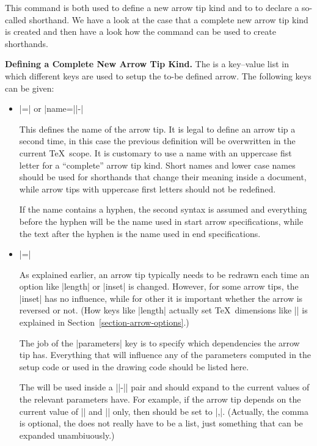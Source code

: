 \begin{command}{\pgfdeclarearrow{}}
  This command is both used to define a new arrow tip kind and to to
  declare a so-called shorthand. We have a look at the case that a
  complete new arrow tip kind is created and then have a look how the
  command can be used to create shorthands.
  
  \medskip
  \noindent\textbf{Defining a Complete New Arrow Tip Kind.}  
  The  is a key--value list in which different keys are
  used to setup the to-be defined arrow. The following keys can be given:

  \begin{itemize}
  \item {}|=| or |name=||-|

    This defines the name of the arrow tip. It is legal to define an
    arrow tip a second time, in this case the previous definition will
    be overwritten in the current \TeX\ scope. It is customary to use
    a name with an uppercase fist letter for a ``complete'' arrow tip
    kind. Short names and lower case names should be used for
    shorthands that change their meaning inside a document, while
    arrow tips with uppercase first letters should not be redefined.

    If the name contains a hyphen, the second syntax is assumed and
    everything before the hyphen will be the name used in start arrow
    specifications, while the text after the hyphen is the name used
    in end specifications.
  \item {}|=|
    
    As explained earlier, an arrow tip typically needs to be redrawn
    each time an option like |length| or |inset| is changed. However,
    for some arrow tips, the |inset| has no influence, while for other
    it is important whether the arrow is reversed or not. (How keys
    like |length| actually set \TeX\ dimensions like |\pgfarrowlength|
    is explained in Section~\ref{section-arrow-options}.)

    The job of the |parameters| key is to specify which dependencies
    the arrow tip has. Everything that will influence any of the
    parameters computed in the setup code or used in the drawing code
    should be listed here.

    The  will be used inside a
    |\csname|-|\endcsname| pair and should expand to the current
    values of the relevant parameters have. For example, if the arrow
    tip depends on the current value of |\pgfarrowlength| and
    |\pgfarrowwidth| only, then  should be set to
    |\the\pgfarrowlength,\the\pgfarrowwidth|. (Actually, the comma is
    optional, the  does not really have to be a
    list, just something that can be expanded unambiuously.)
    

\end{itemize}
\end{command}
